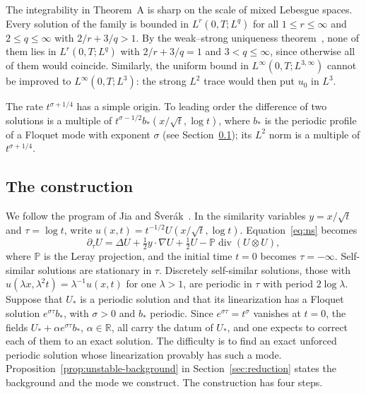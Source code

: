 \documentclass[11pt]{article}
\numberwithin{equation}{section}
\theoremstyle{definition}
\theoremstyle{remark}
\theoremstyle{plain}
\newcommand{\R}{\mathbb R}
\begin{document}
The integrability in Theorem~A is sharp on the scale of mixed Lebesgue
spaces. Every solution of the family is bounded in $L^r(0,T;L^q)$ for
all $1\le r\le\infty$ and $2\le q\le\infty$ with $2/r+3/q>1$. By the
weak--strong uniqueness theorem~\cite{prodi1959,serrin1963,ladyzhenskaya1967},
none of them lies in $L^r(0,T;L^q)$ with $2/r+3/q=1$ and
$3<q\le\infty$, since otherwise all of them would coincide. Similarly,
the uniform bound in $L^\infty(0,T;L^{3,\infty})$ cannot be improved to
$L^\infty(0,T;L^3)$: the strong $L^2$ trace would then put $u_0$ in $L^3$.

The rate $t^{\sigma+1/4}$ has a simple origin. To leading order the
difference of two solutions is a multiple of
$t^{\sigma-1/2}b_*(x/\sqrt t,\log t)$, where $b_*$ is the periodic
profile of a Floquet mode with exponent $\sigma$ (see
Section~\ref{sec:intro-construction}); its $L^2$ norm is a multiple of
$t^{\sigma+1/4}$.

\subsection{The construction}
\label{sec:intro-construction}

We follow the program of Jia and \v Sver\'ak~\cite{jia-sverak2015}.
In the similarity variables $y=x/\sqrt t$ and $\tau=\log t$, write
$u(x,t)=t^{-1/2}U(x/\sqrt t,\log t)$. Equation~\eqref{eq:ns} becomes
\[
 \partial_\tau U=\Delta U+\tfrac12y\cdot\nabla U+\tfrac12U
 -\mathbb P\operatorname{div}(U\otimes U),
\]
where $\mathbb P$ is the Leray projection, and the initial time $t=0$
becomes $\tau=-\infty$. Self-similar solutions are stationary in $\tau$.
Discretely self-similar solutions, those with
$u(\lambda x,\lambda^2t)=\lambda^{-1}u(x,t)$ for one $\lambda>1$, are
periodic in $\tau$ with period $2\log\lambda$. Suppose that $U_*$ is a
periodic solution and that its linearization has a Floquet solution
$e^{\sigma\tau}b_*$, with $\sigma>0$ and $b_*$ periodic. Since
$e^{\sigma\tau}=t^\sigma$ vanishes at $t=0$, the fields
$U_*+\alpha e^{\sigma\tau}b_*$, $\alpha\in\R$, all carry the datum of
$U_*$, and one expects to correct each of them to an exact solution. The
difficulty is to find an exact unforced periodic solution whose
linearization provably has such a mode. Proposition~\ref{prop:unstable-background}
in Section~\ref{sec:reduction} states the background and the mode we
construct. The construction has four steps.
\end{document}
